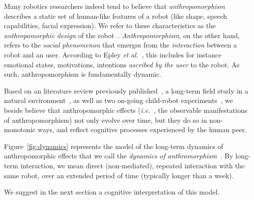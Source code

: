 \documentclass{sig-alternate-2013}
\newcommand{\etal}{{\textit{et al.~}}}
\newcommand{\ie}{{\textit{i.e.~}}}
\begin{document}
Many robotics researchers indeed tend to believe that \emph{anthropomorphism}
describes a static set of human-like features of a robot (like shape, speech
capabilities, facial expression). We refer to these characteristics as the
\emph{anthropomorphic design} of the robot~\cite{fink_anthropomorphism_2012}.
\emph{Anthropomorphism}, on the other hand, refers to the \emph{social
phenomenon} that emerges from the \emph{interaction} between a robot and an
user. According to Epley \etal\cite{epley_when_2008}, this includes for
instance emotional states, motivations, intentions \emph{ascribed by the user}
to the robot. As such, anthropomorphism is fundamentally dynamic.

Based on an literature review previously
published~\cite{fink_anthropomorphism_2012}, a long-term field study in a
natural environment~\cite{fink_living_2013}, as well as two on-going child-robot
experiments~\cite{fink2014which}, we beside believe that anthropomorphic effects
(\ie, the observable manifestations of anthropomorphism) not only evolve over
time, but they do so in non-monotonic ways, and reflect cognitive processes
experienced by the human peer.

Figure~\ref{fig:dynamics} represents the model of the long-term dynamics of
anthropomorphic effects that we call the \emph{dynamics of
anthromorphism}~\cite{lemaignan2014dynamics}. By long-term interaction, we mean
direct (non-mediated), repeated interaction with the same robot, over an
extended period of time (typically longer than a week).

We suggest in the next section a cognitive interpretation of this model.
\end{document}
